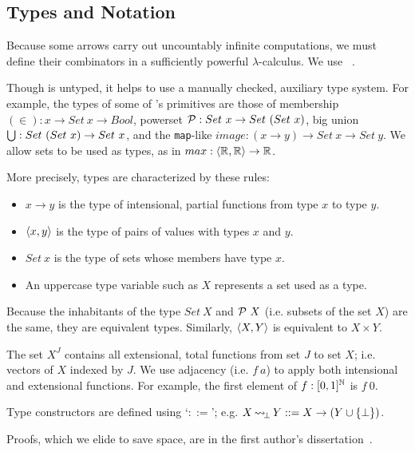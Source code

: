 \documentclass{llncs}
\newcommand{\arrow}{\rightsquigarrow}
\DeclareMathOperator{\botto}{{\arrow\mspace{-3mu}}_\bot}
\begin{document}
\subsection{Types and Notation}

Because some arrows carry out uncountably infinite computations, we must define their combinators in a sufficiently powerful $\lambda$-calculus.
We use \lzfclang~\cite{cit:toronto-2012flops-lzfc}.

Though \lzfclang is untyped, it helps to use a manually checked, auxiliary type system.
For example, the types of some of \lzfclang's primitives are those of membership $(\in) : x \to Set~x \to Bool$, powerset $\mathcal{P} : Set~x \to Set~(Set~x)$, big union $\textstyle\bigcup : Set~(Set~x) \to Set~x$, and the \texttt{map}-like $image : (x \to y) \to Set~x \to Set~y$.
We allow sets to be used as types, as in $max : \langle{\mathbb{R},\mathbb{R}}\rangle \to \mathbb{R}$.

More precisely, types are characterized by these rules:
\begin{itemize}
	\item $x \to y$ is the type of intensional, partial functions from type $x$ to type $y$.
	\item $\langle{x,y}\rangle$ is the type of pairs of values with types $x$ and $y$.
	\item $Set~x$ is the type of sets whose members have type $x$.
	\item An uppercase type variable such as $X$ represents a set used as a type.
\end{itemize}
Because the inhabitants of the type $Set~X$ and $\mathcal{P}~X$ (i.e. subsets of the set $X$) are the same, they are equivalent types.
Similarly, $\langle{X,Y}\rangle$ is equivalent to $X \times Y$.

The set $X^J$ contains all extensional, total functions from set $J$ to set $X$; i.e. vectors of $X$ indexed by $J$.
We use adjacency (i.e. $f~a$) to apply both intensional and extensional functions.
For example, the first element of $f : [0,1]^{\mathbb{N}}$ is $f~0$.

Type constructors are defined using `$::=$'; e.g. $X \botto Y ::= X \to (Y \u \set{\bot})$.

Proofs, which we elide to save space, are in the first author's dissertation~\cite{cit:toronto-thesis}.

\end{document}
